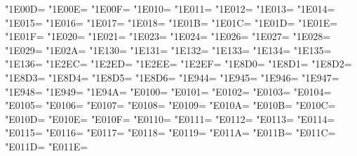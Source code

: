\XeTeXcharclass"1E00D=\KclassCM
\XeTeXcharclass"1E00E=\KclassCM
\XeTeXcharclass"1E00F=\KclassCM
\XeTeXcharclass"1E010=\KclassCM
\XeTeXcharclass"1E011=\KclassCM
\XeTeXcharclass"1E012=\KclassCM
\XeTeXcharclass"1E013=\KclassCM
\XeTeXcharclass"1E014=\KclassCM
\XeTeXcharclass"1E015=\KclassCM
\XeTeXcharclass"1E016=\KclassCM
\XeTeXcharclass"1E017=\KclassCM
\XeTeXcharclass"1E018=\KclassCM
\XeTeXcharclass"1E01B=\KclassCM
\XeTeXcharclass"1E01C=\KclassCM
\XeTeXcharclass"1E01D=\KclassCM
\XeTeXcharclass"1E01E=\KclassCM
\XeTeXcharclass"1E01F=\KclassCM
\XeTeXcharclass"1E020=\KclassCM
\XeTeXcharclass"1E021=\KclassCM
\XeTeXcharclass"1E023=\KclassCM
\XeTeXcharclass"1E024=\KclassCM
\XeTeXcharclass"1E026=\KclassCM
\XeTeXcharclass"1E027=\KclassCM
\XeTeXcharclass"1E028=\KclassCM
\XeTeXcharclass"1E029=\KclassCM
\XeTeXcharclass"1E02A=\KclassCM
\XeTeXcharclass"1E130=\KclassCM
\XeTeXcharclass"1E131=\KclassCM
\XeTeXcharclass"1E132=\KclassCM
\XeTeXcharclass"1E133=\KclassCM
\XeTeXcharclass"1E134=\KclassCM
\XeTeXcharclass"1E135=\KclassCM
\XeTeXcharclass"1E136=\KclassCM
\XeTeXcharclass"1E2EC=\KclassCM
\XeTeXcharclass"1E2ED=\KclassCM
\XeTeXcharclass"1E2EE=\KclassCM
\XeTeXcharclass"1E2EF=\KclassCM
\XeTeXcharclass"1E8D0=\KclassCM
\XeTeXcharclass"1E8D1=\KclassCM
\XeTeXcharclass"1E8D2=\KclassCM
\XeTeXcharclass"1E8D3=\KclassCM
\XeTeXcharclass"1E8D4=\KclassCM
\XeTeXcharclass"1E8D5=\KclassCM
\XeTeXcharclass"1E8D6=\KclassCM
\XeTeXcharclass"1E944=\KclassCM
\XeTeXcharclass"1E945=\KclassCM
\XeTeXcharclass"1E946=\KclassCM
\XeTeXcharclass"1E947=\KclassCM
\XeTeXcharclass"1E948=\KclassCM
\XeTeXcharclass"1E949=\KclassCM
\XeTeXcharclass"1E94A=\KclassCM
\XeTeXcharclass"E0100=\KclassCM
\XeTeXcharclass"E0101=\KclassCM
\XeTeXcharclass"E0102=\KclassCM
\XeTeXcharclass"E0103=\KclassCM
\XeTeXcharclass"E0104=\KclassCM
\XeTeXcharclass"E0105=\KclassCM
\XeTeXcharclass"E0106=\KclassCM
\XeTeXcharclass"E0107=\KclassCM
\XeTeXcharclass"E0108=\KclassCM
\XeTeXcharclass"E0109=\KclassCM
\XeTeXcharclass"E010A=\KclassCM
\XeTeXcharclass"E010B=\KclassCM
\XeTeXcharclass"E010C=\KclassCM
\XeTeXcharclass"E010D=\KclassCM
\XeTeXcharclass"E010E=\KclassCM
\XeTeXcharclass"E010F=\KclassCM
\XeTeXcharclass"E0110=\KclassCM
\XeTeXcharclass"E0111=\KclassCM
\XeTeXcharclass"E0112=\KclassCM
\XeTeXcharclass"E0113=\KclassCM
\XeTeXcharclass"E0114=\KclassCM
\XeTeXcharclass"E0115=\KclassCM
\XeTeXcharclass"E0116=\KclassCM
\XeTeXcharclass"E0117=\KclassCM
\XeTeXcharclass"E0118=\KclassCM
\XeTeXcharclass"E0119=\KclassCM
\XeTeXcharclass"E011A=\KclassCM
\XeTeXcharclass"E011B=\KclassCM
\XeTeXcharclass"E011C=\KclassCM
\XeTeXcharclass"E011D=\KclassCM
\XeTeXcharclass"E011E=\KclassCM
